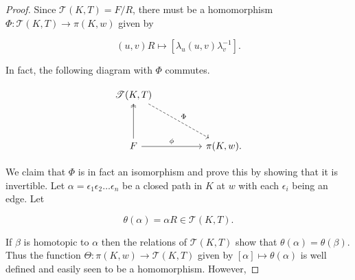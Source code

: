\begin{proof}
Since $\mathcal{T}(K,T) = F/R$, there must be a homomorphism $\Phi: \mathcal{T}(K,T) \rightarrow \pi(K,w)$ given by

\begin{equation*}
  (u,v)R \mapsto [\lambda_u (u,v) \lambda_v^{-1}].
\end{equation*}

In fact, the following diagram with $\Phi$ commutes.

\begin{equation*}
  \begin{tikzcd}[ampersand replacement=\&, sep=huge]
    \mathcal{T}(K,T) \arrow[dr,dashrightarrow,"\Phi"] \\
    F \arrow[u,twoheadrightarrow] \arrow[r,"\phi"] \& \pi(K,w).
  \end{tikzcd}
\end{equation*}

We claim that $\Phi$ is in fact an isomorphism and prove this by showing that it is invertible. Let $\alpha = \epsilon_1 \epsilon_2 \dots \epsilon_n$ be a closed path in $K$ at $w$ with each $\epsilon_i$ being an edge. Let

\begin{equation*}
\theta(\alpha) = \alpha R \in \mathcal{T}(K,T).
\end{equation*}

If $\beta$ is homotopic to $\alpha$ then the relations of $\mathcal{T}(K,T)$ show that $\theta(\alpha) = \theta(\beta)$. Thus the function $\Theta:\pi(K,w) \rightarrow \mathcal{T}(K,T)$ given by $[\alpha] \mapsto \theta(\alpha)$ is well defined and easily seen to be a homomorphism. However,


\end{proof}
